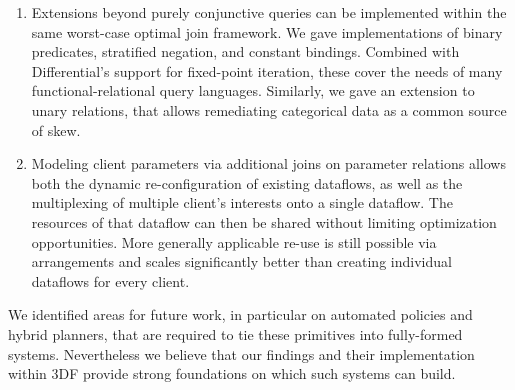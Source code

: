 \documentclass{article}
\begin{document}
\begin{enumerate}
\item
  Extensions beyond purely conjunctive queries can be implemented
  within the same worst-case optimal join framework. We gave
  implementations of binary predicates, stratified negation, and
  constant bindings. Combined with Differential's support for
  fixed-point iteration, these cover the needs of many
  functional-relational query languages. Similarly, we gave an
  extension to unary relations, that allows remediating categorical
  data as a common source of skew.

\item
  Modeling client parameters via additional joins on parameter
  relations allows both the dynamic re-configuration of existing
  dataflows, as well as the multiplexing of multiple client's
  interests onto a single dataflow. The resources of that dataflow can
  then be shared without limiting optimization opportunities. More
  generally applicable re-use is still possible via arrangements and
  scales significantly better than creating individual dataflows for
  every client.

\end{enumerate}

We identified areas for future work, in particular on automated
policies and hybrid planners, that are required to tie these
primitives into fully-formed systems. Nevertheless we believe that our
findings and their implementation within 3DF provide strong
foundations on which such systems can build.

\newpage



\end{document}

